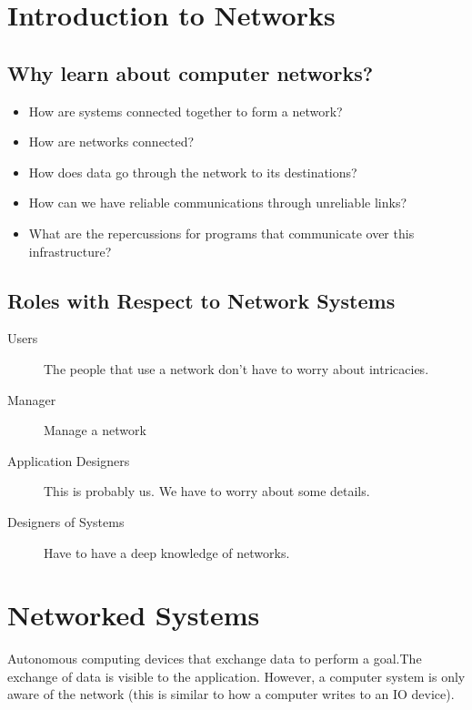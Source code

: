 \section{Introduction to Networks}\label{sec:introduction_to_networks}

\subsection{Why learn about computer networks?}\label{sub:why_learn_about_computer_networks_}

\begin{itemize}
	\item   How are systems connected together to form a network?
	\item How are networks connected?
	\item How does data go through the network to its destinations?
	\item How can we have reliable communications through unreliable links?
	\item What are the repercussions for programs that communicate over this infrastructure?
\end{itemize}

\subsection{Roles with Respect to Network Systems}\label{sub:roles_with_respect_to_network_systems}

\begin{description}
	\item[Users] The people that use a network don't have to worry about intricacies.
	\item[Manager] Manage a network
	\item[Application Designers] This is probably us. We have to worry about some details.
	\item[Designers of Systems] Have to have a deep knowledge of networks.
\end{description}

\section{Networked Systems}\label{sec:networked_systems}

Autonomous computing devices that exchange data to perform a goal.The exchange of data is visible to the application.
However, a computer system is only aware of the network (this is similar to how a computer writes to an IO device).

